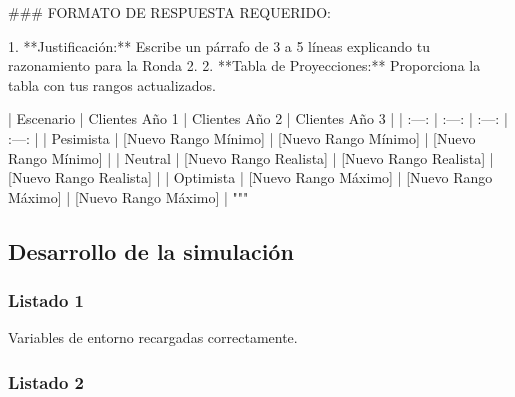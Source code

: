 \begin{APACode}
### FORMATO DE RESPUESTA REQUERIDO:

1.  **Justificación:** Escribe un párrafo de 3 a 5 líneas explicando tu 
    razonamiento para la Ronda 2.
2.  **Tabla de Proyecciones:** Proporciona la tabla con tus rangos actualizados.

| Escenario | Clientes Año 1 | Clientes Año 2 | Clientes Año 3 |
| :---: | :---: | :---: | :---: |
| Pesimista | [Nuevo Rango Mínimo] | [Nuevo Rango Mínimo] | [Nuevo Rango Mínimo] |
| Neutral | [Nuevo Rango Realista] | [Nuevo Rango Realista] | [Nuevo Rango Realista] |
| Optimista | [Nuevo Rango Máximo] | [Nuevo Rango Máximo] | [Nuevo Rango Máximo] |
"""
\end{APACode}

\subsection{Desarrollo de la simulación}

\subsubsection{Listado 1}
\label{anexo:code-6-3-2-1}

\begin{APACode}
[OK] Variables de entorno recargadas correctamente.
\end{APACode}

\subsubsection{Listado 2}
\label{anexo:code-6-3-2-2}

